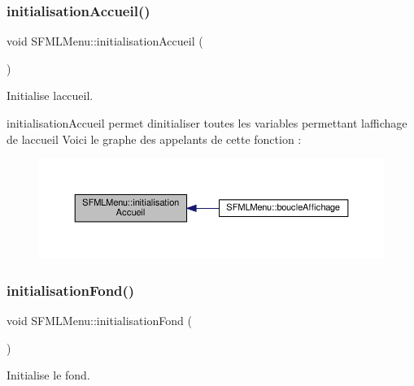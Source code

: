 \subsubsection{\texorpdfstring{initialisation\+Accueil()}{initialisationAccueil()}}
{\footnotesize\ttfamily void S\+F\+M\+L\+Menu\+::initialisation\+Accueil (\begin{DoxyParamCaption}{ }\end{DoxyParamCaption})\hspace{0.3cm}{\ttfamily [private]}}



Initialise l\textquotesingle{}accueil. 

initialisation\+Accueil permet d\textquotesingle{}initialiser toutes les variables permettant l\textquotesingle{}affichage de l\textquotesingle{}accueil Voici le graphe des appelants de cette fonction \+:\nopagebreak
\begin{figure}[H]
\begin{center}
\leavevmode
\includegraphics[width=350pt]{class_s_f_m_l_menu_a563ba1ff94cc5a0a14345ef375f8549f_icgraph}
\end{center}
\end{figure}
\mbox{\label{class_s_f_m_l_menu_a57d8df3871bf10c7ba48dcebdbbd7359}} 
\subsubsection{\texorpdfstring{initialisation\+Fond()}{initialisationFond()}}
{\footnotesize\ttfamily void S\+F\+M\+L\+Menu\+::initialisation\+Fond (\begin{DoxyParamCaption}{ }\end{DoxyParamCaption})\hspace{0.3cm}{\ttfamily [private]}}



Initialise le fond. 

